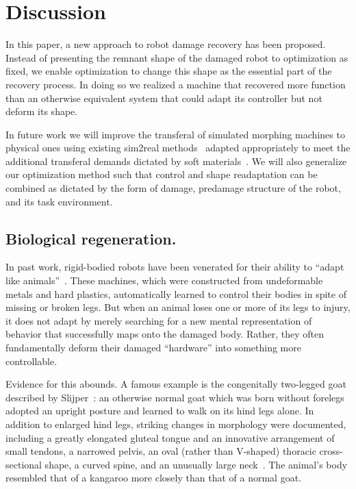 \section{Discussion}
\label{sec:discussion}


In this paper, a new approach to robot damage recovery has been proposed.
Instead of presenting the remnant shape of the damaged robot to optimization as 
fixed,
we enable optimization to change this shape as the essential part of the recovery process.
In doing so we realized a machine that recovered more function than an otherwise equivalent system that could adapt its controller but not deform its shape.

In future work we will improve the transferal of simulated morphing machines
to physical ones using existing sim2real methods~\cite{bharadhwaj2018data, bongard2006resilient, cully2015robots, hwangbo2019learning, kwiatkowski2019task, tan2018sim} adapted appropriately to meet the additional
transferal demands dictated by soft materials~\cite{matas2018sim}. 
We will also generalize our optimization method
such that control and shape readaptation can be combined as dictated by the form of damage, predamage structure of the robot, and its task environment.

\subsection{Biological regeneration.}

In past work, rigid-bodied robots have been venerated for their ability to ``adapt like animals''~\cite{bongard2006resilient,cully2015robots}.
These machines, which were constructed from undeformable metals and hard plastics, 
automatically learned to control their bodies in spite of missing or broken legs.
But when an animal loses one or more of its legs to injury, it does not adapt by merely searching for a new mental representation of behavior that successfully maps onto the damaged body. 
Rather, they often fundamentally deform their damaged ``hardware'' into something more controllable.


Evidence for this abounds.
A famous example is the congenitally two-legged goat described by Slijper~\cite{slijper1942biologic}: 
an otherwise normal goat which was born without forelegs adopted an upright posture and learned to walk on its hind legs alone.
In addition to enlarged 
hind legs, 
striking changes in morphology were documented, including
a greatly elongated gluteal tongue and 
an innovative arrangement of small tendons,
a narrowed pelvis,
an oval (rather than V-shaped) thoracic cross-sectional shape,
a curved spine, 
and an unusually large neck~\cite{west2005developmental}.
The animal's body resembled that of a kangaroo more closely than that of a normal goat.


